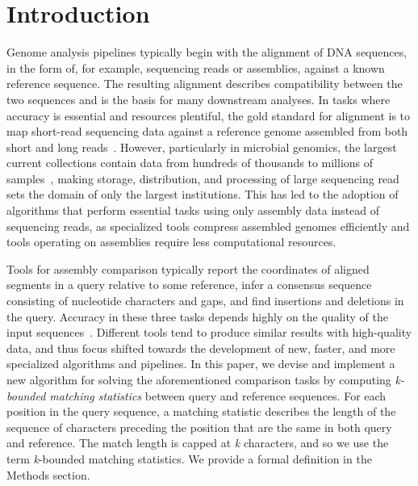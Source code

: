 \documentclass[unnumsec,webpdf,contemporary,large]{oup-authoring-template}%
\theoremstyle{thmstyleone}%
\theoremstyle{thmstyletwo}%
\theoremstyle{thmstylethree}%
\begin{document}

\maketitle


\section{Introduction}
Genome analysis pipelines typically begin with the alignment of DNA sequences, in the form of, for example, sequencing reads or assemblies, against a known reference sequence. The resulting alignment describes compatibility between the two sequences and is the basis for many downstream analyses. In tasks where accuracy is essential and resources plentiful, the gold standard for alignment is to map short-read sequencing data against a reference genome assembled from both short and long reads~\cite{wick2023assembling}. However, particularly in microbial genomics, the largest current collections contain data from hundreds of thousands to millions of samples~\cite{parks2020complete,richardson2023mgnify,hunt2024allthebacteria}, making storage, distribution, and processing of large sequencing read sets the domain of only the largest institutions. This has led to the adoption of algorithms that perform essential tasks using only assembly data instead of sequencing reads, as specialized tools compress assembled genomes efficiently \cite{deorowicz2023agc,bvrinda2024efficient} and tools operating on assemblies require less computational resources.

Tools for assembly comparison typically report the coordinates of aligned segments in a query relative to some reference, infer a consensus sequence consisting of nucleotide characters and gaps, and find insertions and deletions in the query. Accuracy in these three tasks depends highly on the quality of the input sequences~\cite{wick2025reads}.
Different tools tend to produce similar results with high-quality data, and thus focus shifted towards the development of new, faster, and more specialized algorithms and pipelines. 
In this paper, we devise and implement a new algorithm for solving the aforementioned comparison tasks 
by computing {\em \emph{k}-bounded matching statistics} between query and reference sequences. 
For each position in the query sequence, a matching statistic describes the length of the sequence of characters preceding the position that are the same in both query and reference. The match length is capped at \emph{k} characters, and so we use the term \emph{k}-bounded matching statistics. We provide a formal definition in the Methods section.
\end{document}
